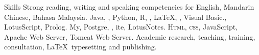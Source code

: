 
\begin{rubric}{Skills}
\entry*[Languages]
	Strong reading, writing and speaking competencies for English, Mandarin Chinese, Bahasa Malaysia.
\entry*[Coding]
	Java, , Python, R, , \LaTeX, , Visual Basic., LotusScript, Prolog.
\entry*[Databases]
	My, Postgre, , ite, LotusNotes.
	\textsc{Html, css}, JavaScript, Apache Web Server, Tomcat Web Server.
\entry*[Misc.]
	Academic research, teaching, training, consultation, \LaTeX\ typesetting and publishing.
\end{rubric}